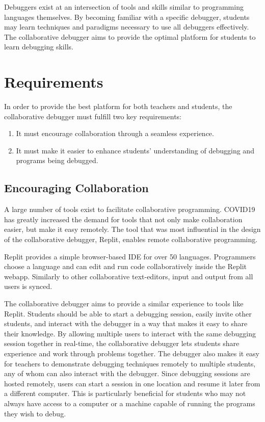 \documentclass[12pt]{article}
\begin{document}
Debuggers exist at an intersection of tools and skills similar to
programming languages themselves. By becoming familiar with a specific
debugger, students may learn techniques and paradigms necessary to use
all debuggers effectively.  The collaborative debugger aims to provide
the optimal platform for students to learn debugging skills.

\section{Requirements}

In order to provide the best platform for both teachers and students,
the collaborative debugger must fulfill two key requirements:

\begin{enumerate}
\item It must encourage collaboration through a seamless experience.
\item It must make it easier to enhance students' understanding of
  debugging and programs being debugged.
\end{enumerate}

\subsection{Encouraging Collaboration} \label{exisitingcollab}

A large number of tools exist to facilitate collaborative programming.
COVID19 has greatly increased the demand for tools that not only make
collaboration easier, but make it easy remotely.  The tool that was
most influential in the design of the collaborative debugger,
Replit\cite{replit}, enables remote collaborative programming.

Replit provides a simple browser-based IDE for over 50 languages.
Programmers choose a language and can edit and run code
collaboratively inside the Replit webapp.  Similarly to other
collaborative text-editors, input and output from all users is synced.
\par

The collaborative debugger aims to provide a similar experience to
tools like Replit.  Students should be able to start a debugging
session, easily invite other students, and interact with the debugger
in a way that makes it easy to share their knowledge.  By allowing
multiple users to interact with the same debugging session together in
real-time, the collaborative debugger lets students share experience
and work through problems together.  The debugger also makes it easy
for teachers to demonstrate debugging techniques remotely to multiple
students, any of whom can also interact with the debugger.  Since
debugging sessions are hosted remotely, users can start a session in
one location and resume it later from a different computer.  This is
particularly beneficial for students who may not always have access to
a computer or a machine capable of running the programs they wish to
debug.
\par
\end{document}
